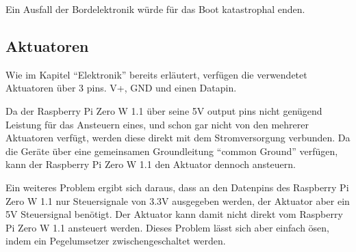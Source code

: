 Ein Ausfall der Bordelektronik würde für das Boot katastrophal enden. 
\subsection{Aktuatoren}
Wie im Kapitel \enquote{Elektronik} bereits erläutert, verfügen die verwendetet Aktuatoren über 3 pins. V+, GND und einen Datapin. 

Da der Raspberry Pi Zero W 1.1 über seine 5V output pins nicht genügend Leistung für das Ansteuern eines, und schon gar nicht von den mehrerer Aktuatoren verfügt, werden diese direkt mit dem Stromversorgung verbunden. Da die Geräte über eine gemeinsamen Groundleitung \enquote{common Ground} verfügen, kann der Raspberry Pi Zero W 1.1 den Aktuator dennoch ansteuern. 

Ein weiteres Problem ergibt sich daraus, dass an den Datenpins des Raspberry Pi Zero W 1.1 nur Steuersignale von 3.3V ausgegeben werden, der Aktuator aber ein 5V Steuersignal benötigt. Der Aktuator kann damit nicht direkt vom Raspberry Pi Zero W 1.1 ansteuert werden. Dieses Problem lässt sich aber einfach  ösen, indem ein Pegelumsetzer zwischengeschaltet werden. 
